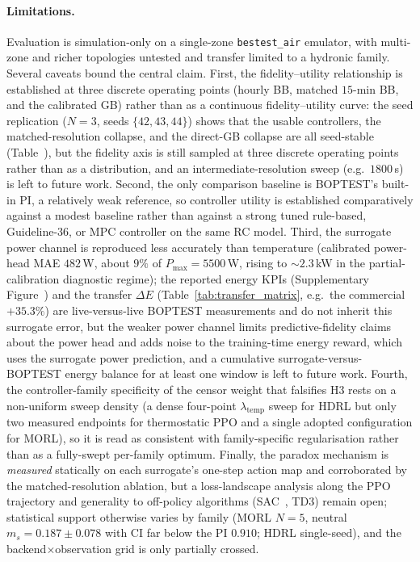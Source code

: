\paragraph{Limitations.}\label{ssec:block1-limitations}\label{ssec:b3lim}
Evaluation is simulation-only on a single-zone \texttt{bestest\_air} emulator, with multi-zone and richer topologies untested and transfer limited to a hydronic family. Several caveats bound the central claim. First, the fidelity--utility relationship is established at three discrete operating points (hourly BB, matched $15$-min BB, and the calibrated GB) rather than as a continuous fidelity--utility curve: the seed replication ($N=3$, seeds $\{42,43,44\}$) shows that the usable controllers, the matched-resolution collapse, and the direct-GB collapse are all seed-stable (Table~), but the fidelity axis is still sampled at three discrete operating points rather than as a distribution, and an intermediate-resolution sweep (e.g.\ $1800$\,s) is left to future work. Second, the only comparison baseline is BOPTEST's built-in PI, a relatively weak reference, so controller utility is established comparatively against a modest baseline rather than against a strong tuned rule-based, Guideline-36, or MPC controller on the same RC model. Third, the surrogate power channel is reproduced less accurately than temperature (calibrated power-head MAE $482$\,W, about $9\%$ of $P_{\max}=5500$\,W, rising to ${\sim}2.3$\,kW in the partial-calibration diagnostic regime); the reported energy KPIs (Supplementary Figure~) and the transfer $\Delta E$ (Table~\ref{tab:transfer_matrix}, e.g.\ the commercial $+35.3\%$) are live-versus-live BOPTEST measurements and do not inherit this surrogate error, but the weaker power channel limits predictive-fidelity claims about the power head and adds noise to the training-time energy reward, which uses the surrogate power prediction, and a cumulative surrogate-versus-BOPTEST energy balance for at least one window is left to future work. Fourth, the controller-family specificity of the censor weight that falsifies H3 rests on a non-uniform sweep density (a dense four-point $\lambda_{\mathrm{temp}}$ sweep for HDRL but only two measured endpoints for thermostatic PPO and a single adopted configuration for MORL), so it is read as consistent with family-specific regularisation rather than as a fully-swept per-family optimum. Finally, the paradox mechanism is \emph{measured} statically on each surrogate's one-step action map and corroborated by the matched-resolution ablation, but a loss-landscape analysis along the PPO trajectory and generality to off-policy algorithms (SAC~\citep{Haarnoja2018SAC}, TD3) remain open; statistical support otherwise varies by family (MORL $N=5$, neutral $m_s=0.187\pm0.078$ with CI far below the PI $0.910$; HDRL single-seed), and the backend$\times$observation grid is only partially crossed.

